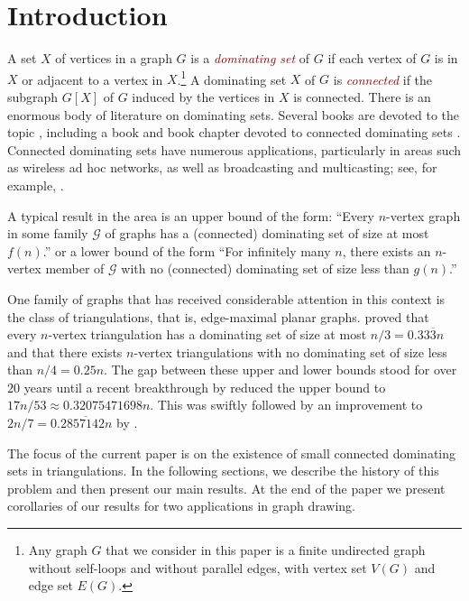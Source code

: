 \documentclass[11pt]{article}
\newcommand{\defin}[1]{\emph{\textcolor{Maroon}{#1}}}
\theoremstyle{definition}
\newcommand{\vida}[1]{[{\color{pink}VD: #1}]}
\begin{document}
\section{Introduction}

A set $X$ of vertices in a graph $G$ is a \defin{dominating set} of $G$ if each vertex of $G$ is in $X$ or adjacent to a vertex in $X$.\footnote{Any graph $G$ that we consider in this paper is a finite undirected graph without self-loops and without parallel edges, with vertex set $V(G)$ and edge set $E(G)$.}  A dominating set $X$ of $G$ is \defin{connected} if the subgraph $G[X]$ of $G$ induced by the vertices in $X$ is connected.  There is an enormous body of literature on dominating sets. Several books are devoted to the topic \cite{haynes.hedetniemi.ea:domination,haynes.hedetniemi.ea:topics,du.wan:connected,haynes.hedetniemi.ea:vol2}, including a book and book chapter devoted to connected dominating sets \cite{du.wan:connected,chellali.favaron:connected}. Connected dominating sets have numerous applications, particularly in areas such as wireless ad hoc networks, as well as broadcasting and multicasting; see, for example, \cite{StojmenovicCDS2002}.


A typical result in the area is an upper bound of the form: ``Every $n$-vertex graph in some family $\mathcal{G}$ of graphs has a (connected) dominating set of size at most $f(n)$.'' or a lower bound of the form ``For infinitely many $n$, there exists an $n$-vertex member of $\mathcal{G}$ with no (connected) dominating set of size less than $g(n)$.''

One family of graphs that has received considerable attention in this context is the class of triangulations, that is, edge-maximal planar graphs. \citet{matheson.tarjan:dominating} proved that every $n$-vertex triangulation has a dominating set of size at most $n/3=0.33\overline{3}n$ and that there exists $n$-vertex triangulations with no dominating set of size less than $n/4=0.25n$. The gap between these upper and lower bounds stood for over $20$ years until a recent breakthrough by \citet{spacapan:domination} reduced the upper bound to $17n/53\approx 0.32075471698n$.  This was swiftly followed by an improvement to $2n/7= 0.2\overline{857142}n$ by \citet{christiansen.rotenberg.ea:triangulations}.

The focus of the current paper is on the existence of small connected dominating sets in triangulations. In the following sections, we describe the history of this problem and then present our main results. At the end of the paper we present corollaries of our results for two applications in graph drawing. 
\end{document}
